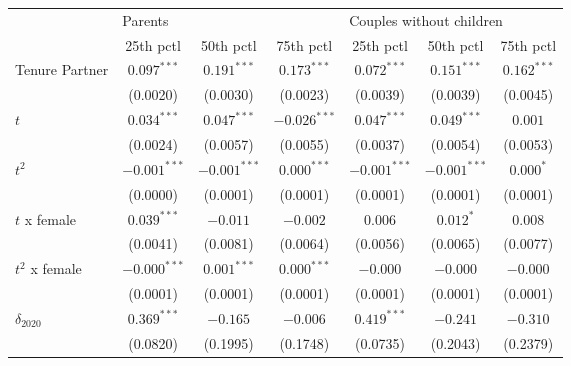 \begin{tabular}{l|ccc|ccc}
\toprule
{} & \multicolumn{3}{l}{Parents} & \multicolumn{3}{l}{Couples without children} \\
{} &       25th pctl &       50th pctl &       75th pctl &                25th pctl &       50th pctl &       75th pctl \\
\midrule
Tenure Partner                         &   $0.097^{***}$ &   $0.191^{***}$ &   $0.173^{***}$ &            $0.072^{***}$ &   $0.151^{***}$ &   $0.162^{***}$ \\
                                       &        (0.0020) &        (0.0030) &        (0.0023) &                 (0.0039) &        (0.0039) &        (0.0045) \\
$t$                                    &   $0.034^{***}$ &   $0.047^{***}$ &  $-0.026^{***}$ &            $0.047^{***}$ &   $0.049^{***}$ &         $0.001$ \\
                                       &        (0.0024) &        (0.0057) &        (0.0055) &                 (0.0037) &        (0.0054) &        (0.0053) \\
$t^2$                                  &  $-0.001^{***}$ &  $-0.001^{***}$ &   $0.000^{***}$ &           $-0.001^{***}$ &  $-0.001^{***}$ &       $0.000^*$ \\
                                       &        (0.0000) &        (0.0001) &        (0.0001) &                 (0.0001) &        (0.0001) &        (0.0001) \\
$t$ x female                           &   $0.039^{***}$ &        $-0.011$ &        $-0.002$ &                  $0.006$ &       $0.012^*$ &         $0.008$ \\
                                       &        (0.0041) &        (0.0081) &        (0.0064) &                 (0.0056) &        (0.0065) &        (0.0077) \\
$t^2$ x female                         &  $-0.000^{***}$ &   $0.001^{***}$ &   $0.000^{***}$ &                 $-0.000$ &        $-0.000$ &        $-0.000$ \\
                                       &        (0.0001) &        (0.0001) &        (0.0001) &                 (0.0001) &        (0.0001) &        (0.0001) \\
$\delta_{2020}$                        &   $0.369^{***}$ &        $-0.165$ &        $-0.006$ &            $0.419^{***}$ &        $-0.241$ &        $-0.310$ \\
                                       &        (0.0820) &        (0.1995) &        (0.1748) &                 (0.0735) &        (0.2043) &        (0.2379) \\

\end{tabular}

